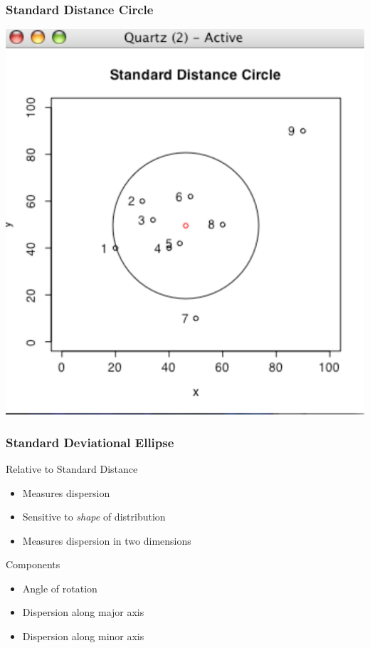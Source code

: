 \documentclass[nototal]{beamer}
\begin{document}
\begin{frame}
   \frametitle{Standard Distance Circle}
   \begin{center}
     \includegraphics[width=.65\linewidth]{standardDistance1}
   \end{center}
 \end{frame}

 \begin{frame}
   \frametitle{Standard Deviational Ellipse}
   \begin{block}{Relative to Standard Distance}
     \begin{itemize}
       \item Measures dispersion
       \item Sensitive to \emph{shape} of distribution
       \item Measures dispersion in two dimensions
     \end{itemize}
    \end{block}
    \begin{block}{Components}
      \begin{itemize}
	\item Angle of rotation
	\item Dispersion along major axis
	\item Dispersion along minor axis
      \end{itemize}
     \end{block}
  \end{frame}
\end{document}
